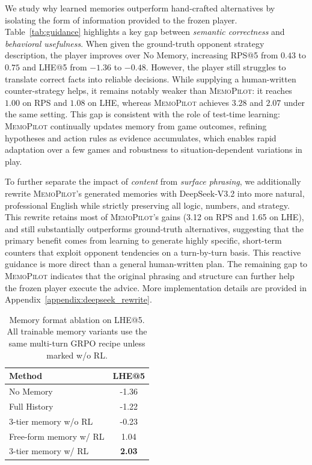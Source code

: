 \documentclass{article}
\newcommand{\methodname}{MemoPilot}
\newcommand{\method}{\textsc{\methodname}}
\theoremstyle{plain}
\theoremstyle{definition}
\theoremstyle{remark}
\begin{document}
We study why learned memories outperform hand-crafted alternatives by isolating the form of information provided to the frozen player. Table~\ref{tab:guidance} highlights a key gap between \emph{semantic correctness} and \emph{behavioral usefulness}. When given the ground-truth opponent strategy description, the player improves over No Memory, increasing RPS@5 from $0.43$ to $0.75$ and LHE@5 from $-1.36$ to $-0.48$. However, the player still struggles to translate correct facts into reliable decisions. While supplying a human-written counter-strategy helps, it remains notably weaker than \method{}: it reaches $1.00$ on RPS and $1.08$ on LHE, whereas \method{} achieves $3.28$ and $2.07$ under the same setting. This gap is consistent with the role of test-time learning: \method{} continually updates memory from game outcomes, refining hypotheses and action rules as evidence accumulates, which enables rapid adaptation over a few games and robustness to situation-dependent variations in play.

To further separate the impact of \emph{content} from \emph{surface phrasing}, we additionally rewrite \method{}'s generated memories with DeepSeek-V3.2 into more natural, professional English while strictly preserving all logic, numbers, and strategy. This rewrite retains most of \method{}'s gains (3.12 on RPS and 1.65 on LHE), and still substantially outperforms ground-truth alternatives, suggesting that the primary benefit comes from learning to generate highly specific, short-term counters that exploit opponent tendencies on a turn-by-turn basis. This reactive guidance is more direct than a general human-written plan. The remaining gap to \method{} indicates that the original phrasing and structure can further help the frozen player execute the advice. More implementation details are provided in Appendix~\ref{appendix:deepseek_rewrite}.

\begin{table}[t]
\centering
\caption{Memory format ablation on LHE@5. All trainable memory variants use the same multi-turn GRPO recipe unless marked w/o RL.}
\label{tab:memory_format}
\small
\begin{tabular}{@{}lc@{}}
\toprule
\textbf{Method} & \textbf{LHE@5} \\
\midrule
No Memory & -1.36 \\
Full History & -1.22 \\
3-tier memory w/o RL & -0.23 \\
Free-form memory w/ RL & 1.04 \\
3-tier memory w/ RL & \textbf{2.03} \\
\bottomrule
\end{tabular}
\end{table}
\end{document}
